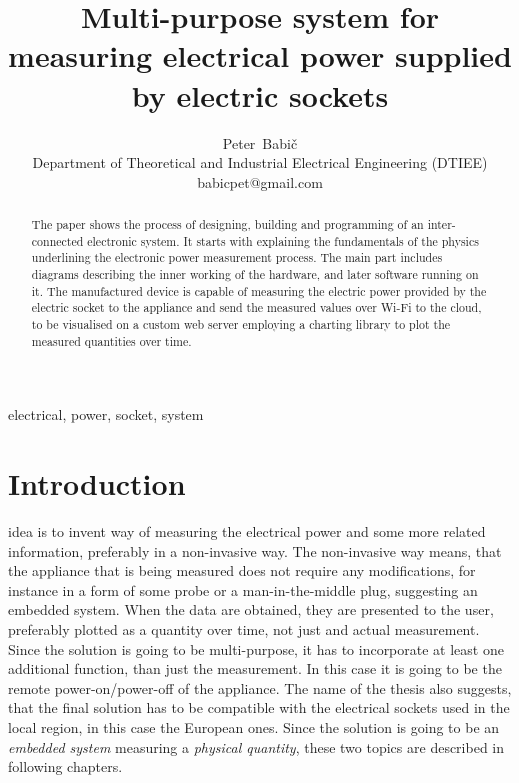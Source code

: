 \documentclass[journal]{IEEEtran}
\begin{document}
\boldmath

\title{Multi-purpose system for measuring electrical power supplied by electric sockets}

\author{Peter~Babič\\%
        Department of Theoretical and Industrial Electrical Engineering (DTIEE)\\%
        babicpet@gmail.com%
}

%
{}


\maketitle


\begin{abstract}
The paper shows the process of designing, building and programming of an inter-connected electronic system. It starts with explaining the fundamentals of the physics underlining the electronic power measurement process. The main part includes diagrams describing the inner working of the hardware, and later software running on it. The manufactured device is capable of measuring the electric power provided by the electric socket to the appliance and send the measured values over Wi-Fi to the cloud, to be visualised on a custom web server employing a charting library to plot the measured quantities over time.
\end{abstract}

\begin{IEEEkeywords}
electrical, power, socket, system
\end{IEEEkeywords}



\IEEEpeerreviewmaketitle



\section{Introduction}

 idea is to invent way of measuring the electrical power and some more related information, preferably in a non-invasive way. The non-invasive way means, that the appliance that is being measured does not require any modifications, for instance in a form of some probe or a man-in-the-middle plug, suggesting an embedded system. When the data are obtained, they are presented to the user, preferably plotted as a quantity over time, not just and actual measurement. Since the solution is going to be multi-purpose, it has to incorporate at least one additional function, than just the measurement. In this case it is going to be the remote power-on/power-off of the appliance. The name of the thesis also suggests, that the final solution has to be compatible with the electrical sockets used in the local region, in this case the European ones. Since the solution is going to be an \textit{embedded system} measuring a \textit{physical quantity}, these two topics are described in following chapters.
\end{document}
